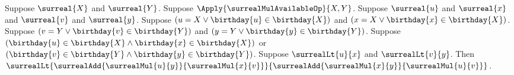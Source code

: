 \begin{lemma}\label{surreal_mul_cross_from_available_properties}
    Suppose $\surreal{X}$ and $\surreal{Y}$.
    Suppose $\Apply{\surrealMulAvailableOp}{X,Y}$.
    Suppose $\surreal{u}$ and $\surreal{x}$ and
        $\surreal{v}$ and $\surreal{y}$.
    Suppose $(u=X\lor\birthday{u}\in\birthday{X})$ and
        $(x=X\lor\birthday{x}\in\birthday{X})$.
    Suppose $(v=Y\lor\birthday{v}\in\birthday{Y})$ and
        $(y=Y\lor\birthday{y}\in\birthday{Y})$.
    Suppose
        $(\birthday{u}\in\birthday{X}\land
            \birthday{x}\in\birthday{X})$
        or
        $(\birthday{v}\in\birthday{Y}\land
            \birthday{y}\in\birthday{Y})$.
    Suppose $\surrealLt{u}{x}$ and $\surrealLt{v}{y}$.
    Then
        $\surrealLt
            {\surrealAdd{\surrealMul{u}{y}}{\surrealMul{x}{v}}}
            {\surrealAdd{\surrealMul{x}{y}}{\surrealMul{u}{v}}}$.
\end{lemma}
